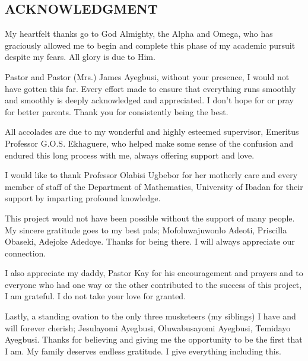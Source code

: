 \documentclass[a4 paper, 12pt]{report}
\theoremstyle{plain}
\begin{document}
\newpage
\begin{center}
	\section*{ACKNOWLEDGMENT}
\end{center}
\noindent
\par My heartfelt thanks go to God Almighty, the Alpha and Omega, who has graciously allowed me to begin and complete this phase of my academic pursuit despite my fears. All glory is due to Him.\\
\par Pastor and Pastor (Mrs.) James Ayegbusi, without your presence, I would not have gotten this far. Every effort made to ensure that everything runs smoothly and smoothly is deeply acknowledged and appreciated. I don't hope for or pray for better parents. Thank you for consistently being the best.\\
\par All accolades are due to my wonderful and highly esteemed supervisor,
Emeritus Professor G.O.S. Ekhaguere, who helped make some sense of the
confusion and endured this long process with me, always offering support
and love.\\
\par I would like to thank Professor Olabisi Ugbebor for her motherly care
and every member of staff of the Department of Mathematics, University of Ibadan for their support by imparting profound knowledge.\\
\par This project would not have been possible without the support of many
people. My sincere gratitude goes to my best pals; Mofoluwajuwonlo Adeoti, Priscilla Obaseki, Adejoke Adedoye. Thanks for being there. I will always appreciate our connection.\\
\par I also appreciate my daddy, Pastor Kay for his encouragement and prayers and to everyone who had one way or the other contributed to the success of this project, I am grateful. I do not take your love for granted.\\
\par Lastly, a standing ovation to the only three musketeers (my siblings) I have and will forever cherish; Jesulayomi Ayegbusi, Oluwabusayomi Ayegbusi, Temidayo Ayegbusi. Thanks for believing and giving me the opportunity to be the first that I am. My family deserves endless gratitude. I give everything including this.
\end{document}
